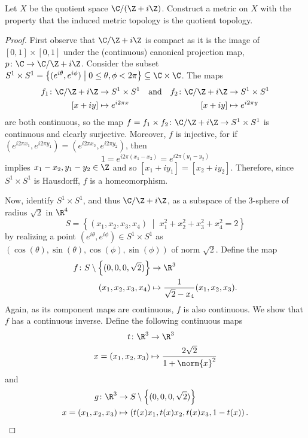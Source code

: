 \documentclass[10pt]{amsart}
\begin{document}
\begin{thm}\label{ex2}
  Let $X$ be the quotient space $\C/(\Z + i\Z)$.
  Construct a metric on $X$ with the property that the induced metric topology is the quotient topology.

  \begin{proof}
    First observe that $\C / \Z + i\Z$ is compact as it is the image of $[0,1] \times [0,1]$ under the (continuous) canonical projection map, $p \colon \C \rightarrow \C/\Z + i\Z$.
    Consider the subset $S^1 \times S^1 = \left\{(e^{i\theta}, e^{i\phi}) \;\middle\vert\; 0 \leq \theta, \phi < 2\pi \right\} \subseteq \C \times \C$.
    The maps
    \begin{align*}
      f_1 \colon \C / \Z + i\Z &\rightarrow S^1 \times S^1 &\text{and}&& f_2 \colon \C / \Z + i\Z & \rightarrow S^1 \times S^1\\
      [x + iy] & \mapsto e^{i2\pi x} &&& [x + iy] & \mapsto e^{i2\pi y}
    \end{align*}
    are both continuous, so the map $f = f_1 \times f_2 \colon \C / \Z + i\Z \rightarrow S^1 \times S^1$ is continuous and clearly surjective.
    Moreover, $f$ is injective, for if $(e^{i2\pi x_1}, e^{i2\pi y_1}) = (e^{i2\pi x_2}, e^{i2\pi y_2})$, then
    $$1 = e^{i2\pi(x_1 - x_2)} = e^{i2\pi(y_1 - y_2)}$$
    implies $x_1 - x_2, y_1 - y_2 \in \Z$ and so $[x_1 + iy_1] = [x_2 + iy_2]$.
    Therefore, since $S^1 \times S^1$ is Hausdorff, $f$ is a homeomorphism.

    Now, identify $S^1 \times S^1$, and thus $\C/\Z + i\Z$, as a subspace of the $3$-sphere of radius $\sqrt{2}$ in $\R^4$
    $$S = \left\{(x_1, x_2, x_3, x_4) \;\middle\vert\; x_1^2 + x_2^2 + x_3^2 + x_4^2 = 2\right\}$$
    by realizing a point $(e^{i\theta}, e^{i\phi}) \in S^1 \times S^1$ as $(\cos(\theta), \sin(\theta), \cos(\phi), \sin(\phi))$ of norm $\sqrt{2}$.
    Define the map
    \begin{align*}
      f  \colon S \setminus \left\{ (0,0,0,\sqrt{2}) \right\} &\rightarrow \R^3\\
      (x_1, x_2, x_3, x_4) &\mapsto \frac{1}{\sqrt{2} - x_4}(x_1, x_2, x_3).
    \end{align*}
    Again, as its component maps are continuous, $f$ is also continuous.
    We show that $f$ has a continuous inverse.
    Define the following continuous maps
    \begin{align*}
      t \colon \R^3 &\rightarrow \R^3\\
      x = (x_1, x_2, x_3) &\mapsto \frac{2\sqrt{2}}{1 + \norm{x}^2}
    \end{align*}
    and
    \begin{align*}
      g \colon \R^3 &\rightarrow S \setminus \left\{ (0,0,0,\sqrt{2}) \right\}\\
      x = (x_1, x_2, x_3) &\mapsto \left(t(x)x_1, t(x)x_2, t(x)x_3, 1 - t(x)\right).
    \end{align*}
    

\end{proof}
\end{thm}
\end{document}
